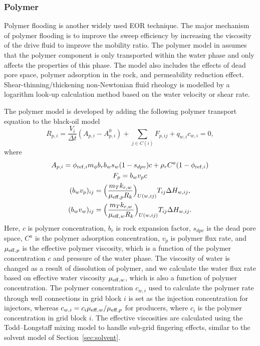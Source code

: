 \subsubsection{Polymer}

Polymer flooding is another widely used EOR technique. The major
mechanism of polymer flooding is to improve the sweep efficiency by increasing
the viscosity of the drive fluid to improve the mobility ratio. The polymer
model in \opm assumes that the polymer component is only transported
within the water phase and only affects the properties of this phase.
The model also includes the effects of dead pore
space, polymer adsorption in the rock, and permeability reduction effect.
Shear-thinning/thickening non-Newtonian fluid rheology is modelled by a
logarithm look-up calculation method based on the water velocity or shear rate.

The polymer model is developed by adding the following polymer transport equation to the
black-oil model
\begin{equation} \label{eq:polymer-transport}
R_{p,i} = \frac{V_i}{\Delta t}(A_{p,i} - A_{p,i}^0) + \sum_{j\in C(i)} F_{p, ij} + q_{w,i} c_{w,i} = 0,
\end{equation}
where
\begin{gather}
A_{p,i} = \phi_{{\rm ref},i} m_\phi b_r b_w s_w (1-s_{dpv}) c  + \rho_r C^a (1-\phi_{{\rm ref},i}) \\
F_{p} = b_w v_p c \\
(b_w{v}_p)_{ij} = \Bigl(\frac{m_T k_{r,w}}{\mu_{{\rm eff},p} R_k}\Bigr)_{U(w, ij)}  T_{ij} \Delta H_{w, ij}, \\
(b_w{v}_w)_{ij} = \Bigl(\frac{m_T k_{r,w}}{\mu_{{\rm eff},w} R_k}\Bigr)_{U(w, ij)}  T_{ij} \Delta H_{w, ij}.
\end{gather}
Here, $c$ is polymer concentration, $b_r$ is rock expansion factor, $s_{dpv}$ is the dead
pore space, $C^a$ is the polymer adsorption concentration, ${v}_p$ is polymer flux rate,
and $\mu_{{\rm eff},p}$ is the effective polymer viscosity, which is a function of the
polymer concentration $c$ and pressure of the water phase. The viscosity of water is
changed as a result of dissolution of polymer, and we calculate the water flux rate based
on effective water viscosity $\mu_{{\rm eff},w}$, which is also a function of polymer
concentration.  The polymer concentration $c_{w,i}$ used to calculate the polymer rate
through well connections in grid block $i$ is set as the injection concentration for
injectors, whereas $c_{w,i} = c_i \mu_{{\rm eff},w}/\mu_{{\rm eff},p}$ for producers,
where $c_i$ is the polymer concentration in grid block $i$. The effective viscosities are
calculated using the Todd--Longstaff mixing model \citep{todd1972development} to handle
sub-grid fingering effects, similar to the solvent model of Section~\ref{sec:solvent}.



